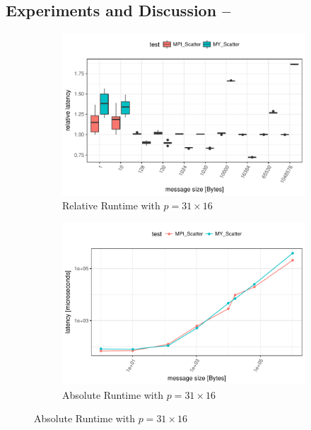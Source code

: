 \subsection{Experiments and Discussion -- \myscatter}

\begin{figure}[H]
    \centering
    
    \begin{subfigure}[b]{0.49\textwidth}
        \includegraphics[width=\textwidth]{../benchmarks/openmpi/divide_conquer/scatter_31/rel_runtime.pdf}
        \caption{Relative Runtime with $p=31 \times 16$}
        \label{fig:Scatter:OpenMPI:Rel:31}
    \end{subfigure}
    \begin{subfigure}[b]{0.49\textwidth}
        \includegraphics[width=\textwidth]{../benchmarks/openmpi/divide_conquer/scatter_31/runtime.pdf}
        \caption{Absolute Runtime with $p=31 \times 16$}
        \label{fig:Scatter:OpenMPI:Abs:31}
    \end{subfigure}
    

\end{figure}
